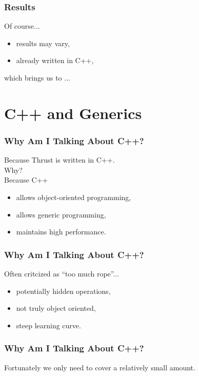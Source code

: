 \documentclass{beamer}
\begin{document}
\begin{frame}
  \frametitle{Results}
  {\Huge Of course...} \\
  \vspace{.5cm}
  \begin{itemize}
    \item results may vary,
    \item already written in C++,
  \end{itemize}
  \vspace{.5cm}
  which brings us to ...
\end{frame}

\section{C++ and Generics}

\begin{frame}
  \frametitle{Why Am I Talking About C++?}
  Because Thrust is written in C++. \\
  \vspace{.2cm}
  \hspace{.5cm}Why? \\
  \vspace{.2cm}
  \hspace{1cm}Because C++
  \vspace{.1cm}
  \begin{itemize}
    \item allows object-oriented programming,
    \item allows generic programming,
    \item maintains high performance.
  \end{itemize}
\end{frame}

\begin{frame}
  \frametitle{Why Am I Talking About C++?}
  Often critcized as ``too much rope''...
  \begin{itemize}
    \item potentially hidden operations,
    \item not truly object oriented,
    \item steep learning curve.
  \end{itemize}
\end{frame}

\begin{frame}
  \frametitle{Why Am I Talking About C++?}
  Fortunately we only need to cover a relatively small
  amount.
\end{frame}
\end{document}
